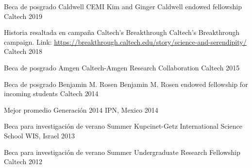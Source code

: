 


\begin{cvhonors}

  \cvhonor
    {Beca de posgrado Caldwell CEMI} %
    {Kim and Ginger Caldwell endowed fellowship} %
    {Caltech} %
    {2019} %

  \cvhonor
    {Historia resaltada en campaña Caltech's Breakthrough}
    {Caltech's Breakthrough campaign. Link:
    \url{https://breakthrough.caltech.edu/story/science-and-serendipity/}} %
    {Caltech} %
    {2018} %

  \cvhonor
    {Beca de posgrado Amgen } %
    {Caltech-Amgen Research Collaboration} %
    {Caltech} %
    {2015} %

  \cvhonor
    {Beca de posgrado Benjamin M. Rosen} %
    {Benjamin M. Rosen endowed fellowship for incoming students} %
    {Caltech} %
    {2014} %

\end{cvhonors}
\pagebreak
{}
\begin{cvhonors}

  \cvhonor
    {Mejor promedio} %
    {Generación 2014} %
    {IPN, Mexico} %
    {2014} %

  \cvhonor
    {Beca para investigación de verano}
    {Summer Kupcinet-Getz International Science School}
    {WIS, Israel} %
    {2013} %

  \cvhonor
    {Beca para investigación de verano}
    {Summer Undergraduate Research Fellowship}
    {Caltech} %
    {2012} %
\end{cvhonors}

